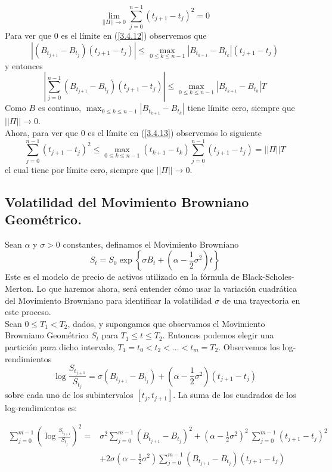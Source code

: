 \documentclass[11pt,notitlepage]{article}
\begin{document}
\begin{equation} \label{3.4.13}
     \lim_{||\Pi|| \to 0} \sum_{j=0}^{n-1}(t_{j+1}-t_j)^2=0
\end{equation}
Para ver que \(0\) es el límite en (\ref{3.4.12}) observemos que
\begin{equation*}
  \left|(B_{t_{j+1}}-B_{t_j})(t_{j+1}-t_j)\right|\leq \max_{0 \leq k \leq n-1} |B_{t_{k+1}}-B_{t_k}| (t_{j+1}-t_j)
\end{equation*}
y entonces
\begin{equation*}
    \left|\sum_{j=0}^{n-1}(B_{t_{j+1}}-B_{t_j})(t_{j+1}-t_j)\right| \leq \max_{0 \leq k \leq n-1}|B_{t_{k+1}}-B_{t_k}| T
\end{equation*}
Como \(B\) es continuo, \(\max_{0 \leq k \leq n-1}|B_{t_{k+1}}-B_{t_k}|\) tiene límite cero, siempre que \(||\Pi|| \to 0\).\\
Ahora, para ver que \(0\) es el límite en (\ref{3.4.13}) observemos lo siguiente
\begin{equation*}
    \sum_{j=0}^{n-1}(t_{j+1}-t_j)^2 \leq \max_{0 \leq k \leq n-1} (t_{k+1}-t_k) \sum_{j=0}^{n-1}(t_{j+1}-t_j)= ||\Pi||T
\end{equation*}
el cual tiene por límite cero, siempre que \(||\Pi|| \to 0\).

\subsection{Volatilidad del Movimiento Browniano Geométrico.}
Sean \(\alpha\) y \(\sigma>0\) constantes, definamos el Movimiento Browniano  %
\[S_t=S_0\exp{\left\{\sigma B_t+\left(\alpha - \frac{1}{2}\sigma^2\right)t\right\}}\]
Este es el modelo de precio de activos utilizado en la fórmula de Black-Scholes-Merton. Lo que haremos ahora, será entender cómo usar la variación cuadrática del Movimiento Browniano para identificar la volatilidad \(\sigma\) de una trayectoria en este proceso.\\

Sean \(0 \leq T_1 < T_2\), dados, y supongamos que observamos el Movimiento Browniano Geométrico \(S_t\) para \(T_1\leq t \leq T_2\). Entonces podemos elegir una partición para dicho intervalo, \(T_1=t_0<t_2<...<t_m=T_2\). Observemos los log-rendimientos
\[\log\frac{S_{t_{j+1}}}{S_{t_j}}=\sigma(B_{t_{j+1}}-B_{t_j})+\left(\alpha - \frac{1}{2}\sigma^2\right)(t_{j+1}-t_j)\]
sobre cada uno de los subintervalos \([t_j, t_{j+1}]\). La suma de los cuadrados de los log-rendimientos es:

\begin{equation} \label{3.4.15}
    \begin{split}
        \sum_{j=0}^{m-1}\left(\log\frac{S_{t_{j+1}}}{S_{t_j}}\right)^2=&\sigma^2 \sum_{j=0}^{m-1}(B_{t_{j+1}}-B_{t_j})^2+\left(\alpha - \frac{1}{2}\sigma^2\right)^2~\sum_{j=0}^{m-1}(t_{j+1}-t_j)^2\\
    &+2\sigma \left(\alpha - \frac{1}{2}\sigma^2\right) \sum_{j=0}^{m-1}(B_{t_{j+1}}-B_{t_j})(t_{j+1}-t_j)
    \end{split}
\end{equation}
\end{document}
